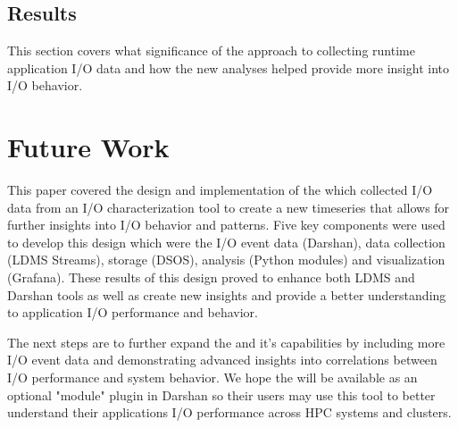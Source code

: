 \documentclass[conference]{IEEEtran}
\begin{document}
\subsection{Results}
This section covers what significance of the approach to collecting runtime application I/O data and how the new analyses helped provide more insight into I/O behavior.

\section{Future Work}
This paper covered the \Darshan design and implementation of the \connector which collected I/O data from an I/O characterization tool to create a new timeseries that allows for further insights into I/O behavior and patterns. Five key components were used to develop this design which were the I/O event data (Darshan), data collection (LDMS Streams), storage (DSOS), analysis (Python modules) and visualization (Grafana).
These results of this design proved to enhance both LDMS and Darshan tools as well as create new insights and provide a better understanding to application I/O performance and behavior. 

The next steps are to further expand the \connector and it's capabilities by including more I/O event data and demonstrating advanced insights into correlations between I/O performance and system behavior. We hope the \Darshan will be available as an optional "module" plugin in Darshan so their users may use this tool to better understand their applications I/O performance across HPC systems and clusters. 





%
%
\end{document}
